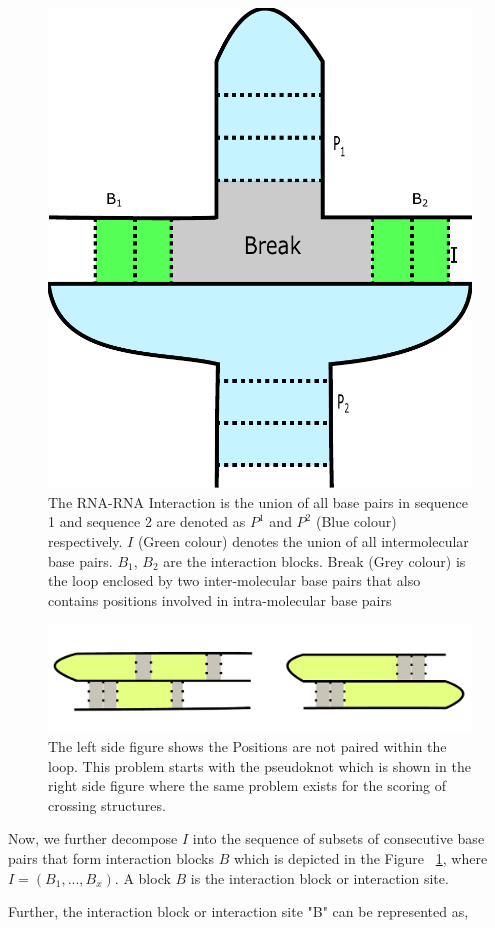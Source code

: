 \documentclass[twoside,a4paper]{report}
\numberwithin{equation}{section}
\begin{document}
 
	 	\begin{figure}[tb]
		\includegraphics[width=0.4\linewidth]{rnarna.pdf}
		\centering
		\caption{The RNA-RNA Interaction is the union of all base pairs in sequence 1 and sequence 2 are denoted as $P^1$ and $P^2$ (Blue colour) respectively. $I$ (Green colour) denotes the union of all intermolecular base pairs. $B_1$, $B_2$ are the interaction blocks. Break (Grey colour) is the loop enclosed by two inter-molecular base pairs that also contains positions involved in intra-molecular base pairs}
		\label{fig:rnarna}
	\end{figure}
	
 		\begin{figure}[tb]
 		\includegraphics[width=1.0\linewidth]{pseudoknot.pdf}
 		\centering
 		\caption{ The left side figure shows the Positions are not paired within the loop. This problem starts with the pseudoknot which is shown in the right side figure where the same problem exists for the scoring of crossing structures. }
 		\label{fig:pseudoknot}
 	\end{figure}
 	
 	Now, we further decompose $I$ into the sequence of subsets of consecutive base pairs that form interaction blocks $B$ which is depicted in the Figure ~\ref{fig:rnarna}, where $ I = (B_1 ,..., B_x)$. A block $B$ is the interaction block or interaction site.
 
 	Further, the interaction block or interaction site "B" can be represented as,
 	
\end{document}
